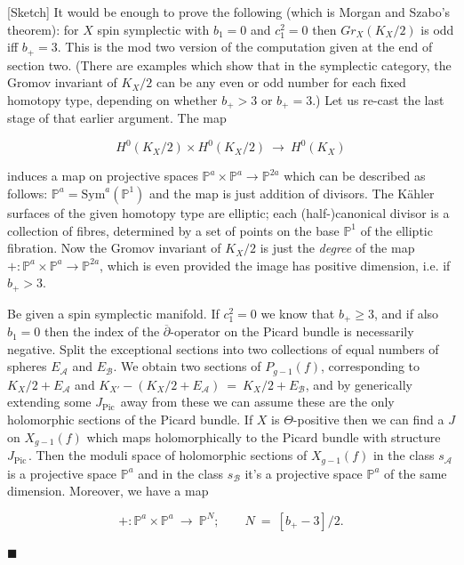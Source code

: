 \documentclass[10pt]{article}
\newcommand{\pp}{\mathbb{P}}
\newcommand{\cdbar}{\overline{\partial}}
\newcommand{\Sym}{\mathrm{Sym}}
\newcommand{\Pic}{\mathrm{Pic \,}}
\newenvironment{Pf}{\par \noindent{\sc Proof:} }{\quad $\blacksquare$ \par
\vspace{0.5cm}}
\begin{document}
\begin{Pf}[Sketch]
It would be enough to prove the following (which is Morgan
and Szabo's theorem):  for $X$  spin symplectic with $b_1 = 0$ and
$c_1^2 = 0$ then $Gr_X (K_X / 2)$ is odd iff $b_+ = 3$.  This is the
mod two version of the computation given at the end of section two.
(There are examples which show that in the
symplectic category,
the Gromov invariant of $K_X / 2$ can be any even or odd number for each
fixed homotopy type, depending on whether $b_+ > 3$ or $b_+ = 3$.)
Let us re-cast the last stage of that earlier argument.  The map

$$H^0 (K_X / 2) \times H^0 (K_X / 2) \ \rightarrow \ H^0 (K_X)$$

\noindent induces a map on projective spaces $\pp^a \times \pp^a
\rightarrow \pp^{2a}$ which can be described as follows:  $\pp^a =
\Sym^a (\pp^1)$ and the map is just addition of divisors.  The
K\"ahler surfaces of the given homotopy type are elliptic; each
(half-)canonical divisor is a collection of fibres, determined by a
set of points on the base 
$\pp^1$ of the elliptic fibration.  Now the Gromov invariant of $K_X /
2$ is just the \emph{degree} of the map $+: \pp^a \times \pp^a
\rightarrow \pp^{2a}$, which is even provided the image has positive
dimension, i.e. if $b_+ > 3$. 

\vspace{0.2cm}

\noindent Be given a spin symplectic manifold.  If  $c_1^2 =
0$ we know that $b_+ \geq 3$, and if also $b_1 = 0$ then the index of
the $\cdbar$-operator on the Picard bundle is necessarily negative.
Split the exceptional sections into two collections of equal numbers
of spheres $E_{\mathcal{A}}$ and $E_{\mathcal{B}}$.  We obtain two
sections of $P_{g-1}(f)$, corresponding to $K_X/2 + E_{\mathcal{A}}$
and $K_{X'} - (K_X/2 + E_{\mathcal{A}}) \ = \ K_X/2 +
E_{\mathcal{B}}$, and by generically extending some $J_{\Pic}$ away from
these we can assume these are the only holomorphic sections of the
Picard bundle.  If $X$ is $\Theta$-positive then we can find a $J$ on
$X_{g-1}(f)$ which maps holomorphically to the Picard bundle with
structure $J_{\Pic}$.  Then the moduli space of holomorphic
sections of 
$X_{g-1}(f)$ in the class $s_{\mathcal{A}}$ is a projective space
$\pp^a$ and in the class $s_{\mathcal{B}}$ it's a projective space
$\pp^a$ of the same dimension.  Moreover, we have a map

$$+: \pp^a \times \pp^a \ \rightarrow \ \pp^N; \qquad N \ = \
[b_+ - 3]/2.$$ 
  

\end{Pf}
\end{document}
